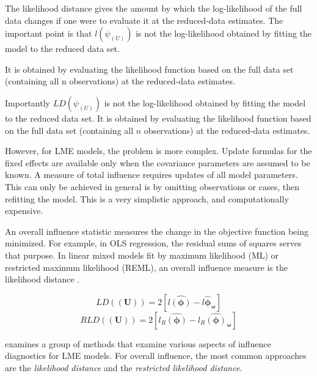 \documentclass[12pt, a4paper]{report}
\theoremstyle{plain}
\theoremstyle{definition}
\theoremstyle{remark}
\begin{document}
	The likelihood distance gives the amount by which the log-likelihood of the full data changes if one were to evaluate it at the reduced-data estimates. The important point is that $l(\psi_{(U)})$ is not the log-likelihood obtained by fitting the model to the reduced data set.
	
	It is obtained by evaluating the likelihood function based on the full data set (containing all n observations) at the reduced-data estimates.
	
	
	
	
	Importantly $LD(\psi_{(U)})$ is not the log-likelihood obtained by fitting the model to the reduced data set. It is obtained by evaluating the likelihood function based on the full data set (containing all $n$ observations) at the reduced-data estimates.
	
	
	However, for LME models, the problem is more complex. Update formulas for the fixed effects are available only when the covariance parameters are assumed to be known. A measure of total influence requires updates of all model parameters. This can only be achieved in general is by omitting observations or cases, then refitting the model. This is a very simplistic approach, and computationally expensive.
	
	
	
	An overall influence statistic measures the change in the objective function being minimized. For example, in
	OLS regression, the residual sums of squares serves that purpose. In linear mixed models fit by
	 maximum likelihood (ML) or  restricted maximum likelihood (REML), an overall influence measure is the  likelihood distance \citep{cook}. 
	
	
	\[  LD(\boldsymbol{(U)})= 2[l\boldsymbol{\hat{(\phi)}} - l\boldsymbol{\hat{\phi}_\omega} ] \]
	\[  RLD(\boldsymbol{(U)})= 2[ l_R\boldsymbol{\hat{(\phi)}} - l_R\boldsymbol{\hat{(\phi)}_\omega} ] \]
	
	\citet{west} examines a group of methods that examine various aspects of influence diagnostics for LME models.
	For overall influence, the most common approaches are the \textit{likelihood distance} and the \textit{restricted likelihood distance}.
	
\end{document}
